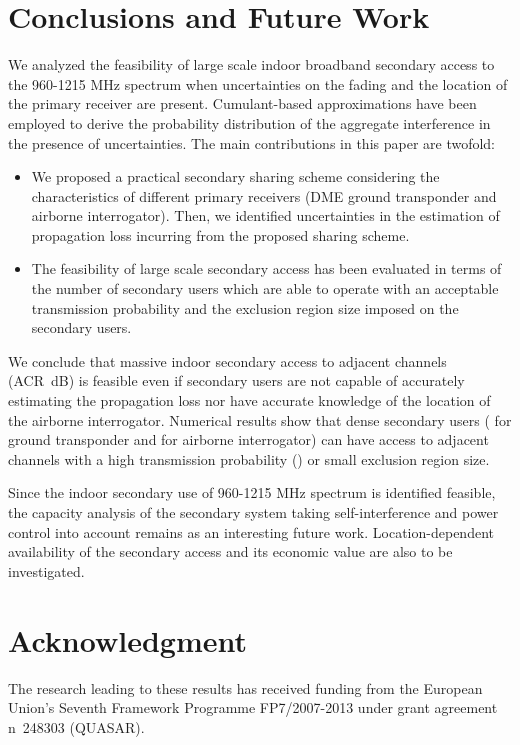 \documentclass[12pt,submission,journal,onecolumn]{IEEEtran}
\begin{document}
\section{Conclusions and Future Work}
\label{sec:Conclusions}
We analyzed the feasibility of large scale indoor broadband secondary access to the 960-1215 MHz spectrum when uncertainties on the fading and the location of the primary receiver are present. Cumulant-based approximations have been employed to derive the probability distribution of the aggregate interference in the presence of uncertainties. The main contributions in this paper are twofold:
\begin{itemize}
\item We proposed a practical secondary sharing scheme considering the characteristics of different primary receivers (DME ground transponder and airborne interrogator). Then, we identified uncertainties in the estimation of propagation loss incurring from the proposed sharing scheme.
\item The feasibility of large scale secondary access has been evaluated in terms of the number of secondary users which are able to operate with an acceptable transmission probability and the exclusion region size imposed on the secondary users.
\end{itemize}

We conclude that massive indoor secondary access to adjacent channels (ACR~dB) is feasible even if secondary users are not capable of accurately estimating the propagation loss nor have accurate knowledge of the location of the airborne interrogator. Numerical results show that dense secondary users ( for ground transponder and  for airborne interrogator) can have access to adjacent channels with a high transmission probability () or small exclusion region size. 

Since the indoor secondary use of 960-1215 MHz spectrum is identified feasible, the capacity analysis of the secondary system taking self-interference and power control into account remains as an interesting future work. Location-dependent availability of the secondary access and its economic value are also to be investigated.

\section*{Acknowledgment}
The research leading to these results has received funding from the European Union's Seventh Framework Programme FP7/2007-2013 under grant agreement n~248303 (QUASAR). 
\end{document}

